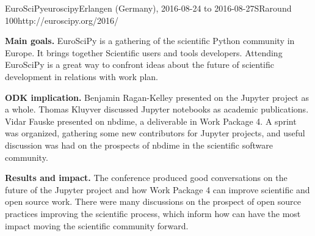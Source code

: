 \begin{event}{EuroSciPy}{euroscipy}{Erlangen (Germany), 2016-08-24 to 2016-08-27}{SR}{around 100}{http://euroscipy.org/2016/}

\textbf{Main goals.} EuroSciPy is a gathering of the scientific Python community in Europe.
It brings together Scientific users and tools developers. Attending EuroSciPy
 is a great way to confront ideas about the future of scientific development
in relations with \ODK work plan.

\textbf{ODK implication.} Benjamin Ragan-Kelley presented on the Jupyter project as a whole.
Thomas Kluyver discussed Jupyter notebooks as academic publications.
Vidar Fauske presented on nbdime, a deliverable in Work Package 4.
A sprint was organized, gathering some new contributors for Jupyter projects,
and useful discussion was had on the prospects of nbdime in the scientific software community.

\textbf{Results and impact.} The conference produced good conversations on the future of the Jupyter project and how Work Package 4 can improve scientific and open source work.
There were many discussions on the prospect of open source practices improving the scientific process,
which inform how \ODK can have the most impact moving the scientific community forward.
\end{event}
